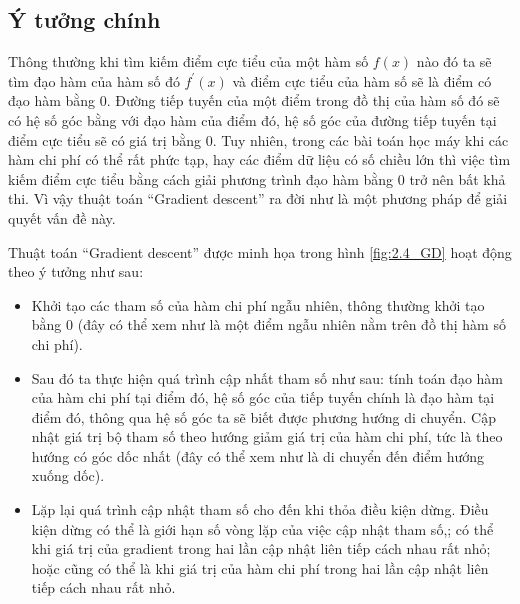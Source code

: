 \subsection{Ý tưởng chính}
Thông thường khi tìm kiếm điểm cực tiểu của một hàm số $f(x)$ nào đó ta sẽ tìm đạo hàm của hàm số đó $f^{'}(x)$ và điểm cực tiểu của hàm số sẽ là điểm có đạo hàm bằng 0. Đường tiếp tuyến của một điểm trong đồ thị của hàm số đó sẽ có hệ số góc bằng với đạo hàm của điểm đó, hệ số góc của đường tiếp tuyến tại điểm cực tiểu sẽ có giá trị bằng 0.
Tuy nhiên, trong các bài toán học máy khi các hàm chi phí có thể rất phức tạp, hay các điểm dữ liệu có số chiều lớn thì việc tìm kiếm điểm cực tiểu bằng cách giải phương trình đạo hàm bằng 0 trở nên bất khả thi. Vì vậy thuật toán ``Gradient descent'' ra đời như là một phương pháp để giải quyết vấn đề này.

Thuật toán ``Gradient descent'' được minh họa trong hình \ref{fig:2.4_GD} hoạt động theo ý tưởng như sau: 
\begin{itemize}
    \item Khởi tạo các tham số của hàm chi phí ngẫu nhiên, thông thường khởi tạo bằng 0 (đây có thể xem như là một điểm ngẫu nhiên nằm trên đồ thị hàm số chi phí). 
    \item Sau đó ta thực hiện quá trình cập nhất tham số như sau: tính toán đạo hàm của hàm chi phí tại điểm đó, hệ số góc của tiếp tuyến chính là đạo hàm tại điểm đó, thông qua hệ số góc ta sẽ biết được phương hướng di chuyển. Cập nhật giá trị bộ tham số theo hướng giảm giá trị của hàm chi phí, tức là theo hướng có góc dốc nhất (đây có thể xem như là di chuyển đến điểm hướng xuống dốc).
    \item Lặp lại quá trình cập nhật tham số cho đến khi thỏa điều kiện dừng. Điều kiện dừng có thể là giới hạn số vòng lặp của việc cập nhật tham số,; có thể khi giá trị của gradient trong hai lần cập nhật liên tiếp cách nhau rất nhỏ; hoặc cũng có thể là khi giá trị của hàm chi phí trong hai lần cập nhật liên tiếp cách nhau rất nhỏ.
\end{itemize}

